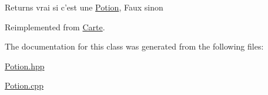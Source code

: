 \begin{DoxyReturn}{Returns}
vrai si c'est une \hyperlink{class_potion}{Potion}, Faux sinon 
\end{DoxyReturn}


Reimplemented from \hyperlink{class_carte_a3be68ed1ee99d835cd27148e456e5b9c}{Carte}.



The documentation for this class was generated from the following files\-:\begin{DoxyCompactItemize}
\item 
\hyperlink{_potion_8hpp}{Potion.\-hpp}\item 
\hyperlink{_potion_8cpp}{Potion.\-cpp}\end{DoxyCompactItemize}
